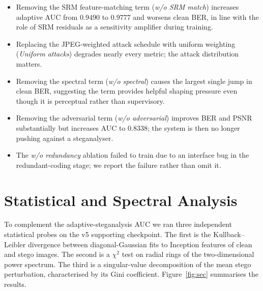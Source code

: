 \documentclass[journal]{IEEEtran}
\begin{document}
\begin{itemize}
    \item Removing the SRM feature-matching term (\emph{w/o SRM
    match}) increases adaptive AUC from $0.9490$ to $0.9777$ and
    worsens clean BER, in line with the role of SRM residuals as a
    sensitivity amplifier during training.
    \item Replacing the JPEG-weighted attack schedule with uniform
    weighting (\emph{Uniform attacks}) degrades nearly every
    metric; the attack distribution matters.
    \item Removing the spectral term (\emph{w/o spectral}) causes
    the largest single jump in clean BER, suggesting the term
    provides helpful shaping pressure even though it is perceptual
    rather than supervisory.
    \item Removing the adversarial term (\emph{w/o adversarial})
    improves BER and PSNR substantially but increases AUC to
    $0.8338$; the system is then no longer pushing against a
    steganalyser.
    \item The \emph{w/o redundancy} ablation failed to train due to
    an interface bug in the redundant-coding stage; we report the
    failure rather than omit it.
\end{itemize}

\begin{table}[t]
\centering
\caption{Short-run component ablations from the v5 branch. All
variants share the same warm start and $8\,\mathrm{k}$-step budget.}
\label{tab:comp}
\end{table}

\section{Statistical and Spectral Analysis}
\label{sec:security}

To complement the adaptive-steganalysis AUC we ran three independent
statistical probes on the v5 supporting checkpoint. The first is the
Kullback--Leibler divergence between diagonal-Gaussian fits to
Inception features of clean and stego images. The second is a
$\chi^2$ test on radial rings of the two-dimensional power
spectrum. The third is a singular-value decomposition of the mean
stego perturbation, characterised by its Gini coefficient.
Figure~\ref{fig:sec} summarises the results.
\end{document}
